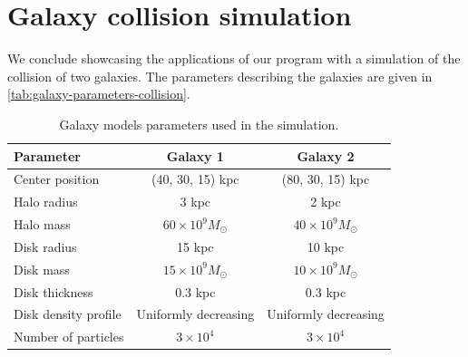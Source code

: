 \section{Galaxy collision simulation}
We conclude showcasing the applications of our program with a simulation of the collision of two galaxies.
The parameters describing the galaxies are given in \autoref{tab:galaxy-parameters-collision}.
\begin{table}[htp]
    \centering
    \caption{Galaxy models parameters used in the simulation.}
    \label{tab:galaxy-parameters-collision}
    \begin{tabular}{lcc}
        \toprule
        \textbf{Parameter}   & \textbf{Galaxy 1}        & \textbf{Galaxy 2}        \\
        \midrule
        Center position      & (40, 30, 15) kpc         & (80, 30, 15) kpc         \\
        Halo radius          & 3 kpc                    & 2 kpc                    \\
        Halo mass            & $60 \times 10^9 M_\odot$ & $40 \times 10^9 M_\odot$ \\
        Disk radius          & 15 kpc                   & 10 kpc                   \\
        Disk mass            & $15 \times 10^9 M_\odot$ & $10 \times 10^9 M_\odot$ \\
        Disk thickness       & 0.3 kpc                  & 0.3 kpc                  \\
        Disk density profile & Uniformly decreasing     & Uniformly decreasing     \\
        Number of particles  & $3 \times 10^4$          & $3 \times 10^4$          \\
        \bottomrule
    \end{tabular}
\end{table}

